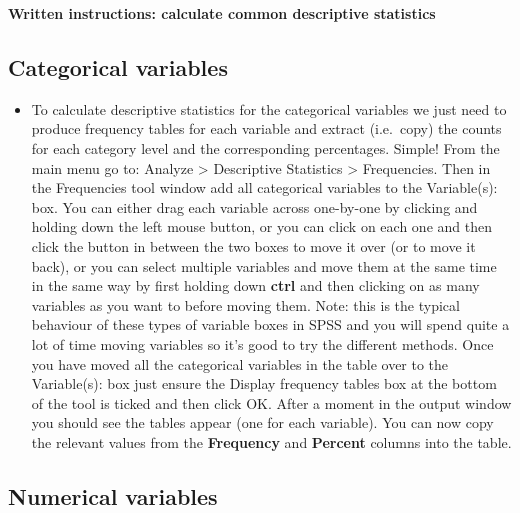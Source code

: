 \documentclass[
]{book}
\providecommand{\tightlist}{%
  \setlength{\itemsep}{0pt}\setlength{\parskip}{0pt}}
\begin{document}
\textbf{Written instructions: calculate common descriptive statistics}

\hypertarget{categorical-variables}{%
\subsection{Categorical variables}\label{categorical-variables}}

\begin{itemize}
\tightlist
\item
  To calculate descriptive statistics for the categorical variables we just need to produce frequency tables for each variable and extract (i.e.~copy) the counts for each category level and the corresponding percentages. Simple! From the main menu go to: Analyze \textgreater{} Descriptive Statistics \textgreater{} Frequencies. Then in the Frequencies tool window add all categorical variables to the Variable(s): box. You can either drag each variable across one-by-one by clicking and holding down the left mouse button, or you can click on each one and then click the button in between the two boxes to move it over (or to move it back), or you can select multiple variables and move them at the same time in the same way by first holding down \textbf{ctrl} and then clicking on as many variables as you want to before moving them. Note: this is the typical behaviour of these types of variable boxes in SPSS and you will spend quite a lot of time moving variables so it's good to try the different methods. Once you have moved all the categorical variables in the table over to the Variable(s): box just ensure the Display frequency tables box at the bottom of the tool is ticked and then click OK. After a moment in the output window you should see the tables appear (one for each variable). You can now copy the relevant values from the \textbf{Frequency} and \textbf{Percent} columns into the table.
\end{itemize}

\hypertarget{numerical-variables}{%
\subsection{Numerical variables}\label{numerical-variables}}
\end{document}
